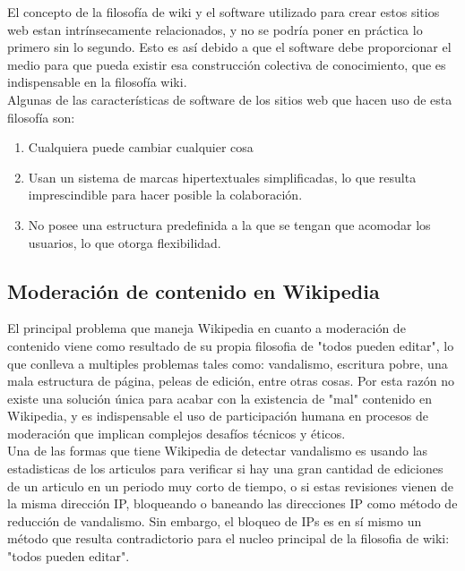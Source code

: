         El concepto de la filosofía de wiki y el software utilizado para crear estos sitios web estan intrínsecamente relacionados, y no se podría poner en práctica lo primero sin lo segundo. Esto es así debido a que el software debe proporcionar el medio para que pueda existir esa construcción colectiva de conocimiento, que es indispensable en la filosofía wiki.\\
        
        Algunas de las características de software de los sitios web que hacen uso de esta filosofía son: 
    
        \begin{enumerate}
            \item Cualquiera puede cambiar cualquier cosa
            \item Usan un sistema de marcas hipertextuales simplificadas, lo que resulta imprescindible para hacer posible la colaboración.
            \item No posee una estructura predefinida a la que se tengan que acomodar los usuarios, lo que otorga flexibilidad.
        \end{enumerate}

        \subsection{Moderación de contenido en Wikipedia}

        \iffalse  \fi

        El principal problema que maneja Wikipedia en cuanto a moderación de contenido viene como resultado de su propia filosofia de "todos pueden editar", lo que conlleva a multiples problemas tales como: vandalismo, escritura pobre, una mala estructura de página, peleas de edición, entre otras cosas. Por esta razón no existe una solución única para acabar con la existencia de "mal" contenido en Wikipedia, y es indispensable el uso de participación humana en procesos de moderación que implican complejos desafíos técnicos y éticos.\\

        Una de las formas que tiene Wikipedia de detectar vandalismo es usando las estadisticas de los articulos para verificar si hay una gran cantidad de ediciones de un articulo en un periodo muy corto de tiempo, o si estas revisiones vienen de la misma dirección IP, bloqueando o baneando las direcciones IP como método de reducción de vandalismo. Sin embargo, el bloqueo de IPs es en sí mismo un método que resulta contradictorio para el nucleo principal de la filosofia de wiki: "todos pueden editar".

